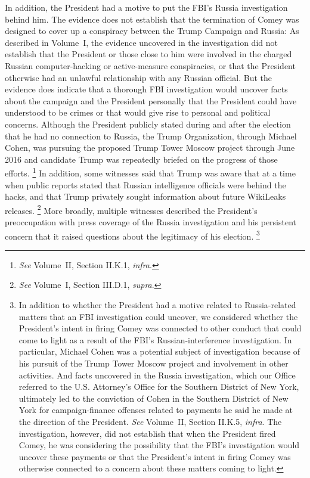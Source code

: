 {In addition, the President had a motive to put the FBI's Russia investigation behind him.
The evidence does not establish that the termination of Comey was designed to cover up a conspiracy between the Trump Campaign and Russia: As described in Volume~I, the evidence uncovered in the investigation did not establish that the President or those close to him were involved in the charged Russian computer-hacking or active-measure conspiracies, or that the President otherwise had an unlawful relationship with any Russian official.
But the evidence does indicate that a thorough FBI investigation would uncover facts about the campaign and the President personally that the President could have understood to be crimes or that would give rise to personal and political concerns.
Although the President publicly stated during and after the election that he had no connection to Russia, the Trump Organization, through Michael Cohen, was pursuing the proposed Trump Tower Moscow project through June 2016 and candidate Trump was repeatedly briefed on the progress of those efforts.%
\footnote{\textit{See} Volume~II, Section II.K.1, \textit{infra}.}
In addition, some witnesses said that Trump was aware that 
at a time when public reports stated that Russian intelligence officials were behind the hacks, and that Trump privately sought information about future WikiLeaks releases.%
\footnote{\textit{See} Volume~I, Section III.D.1, \textit{supra}.}
More broadly, multiple witnesses described the President's preoccupation with press coverage of the Russia investigation and his persistent concern that it raised questions about the legitimacy of his election.%
\footnote{In addition to whether the President had a motive related to Russia-related matters that an FBI investigation could uncover, we considered whether the President's intent in firing Comey was connected to other conduct that could come to light as a result of the FBI's Russian-interference investigation.
In particular, Michael Cohen was a potential subject of investigation because of his pursuit of the Trump Tower Moscow project and involvement in other activities.
And facts uncovered in the Russia investigation, which our Office referred to the U.S. Attorney's Office for the Southern District of New York, ultimately led to the conviction of Cohen in the Southern District of New York for campaign-finance offenses related to payments he said he made at the direction of the President.
\textit{See} Volume~II, Section II.K.5, \textit{infra}.
The investigation, however, did not establish that when the President fired Comey, he was considering the possibility that the FBI's investigation would uncover these payments or that the President's intent in firing Comey was otherwise connected to a concern about these matters coming to light.}

}
